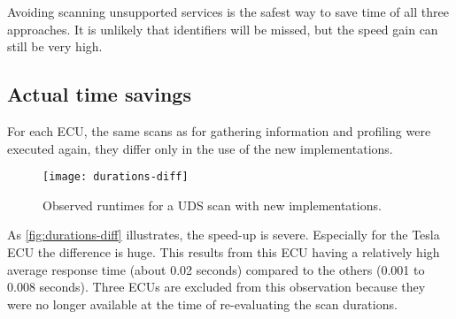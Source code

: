 Avoiding scanning unsupported services is the safest way to save time of all three approaches. It is unlikely that identifiers will be missed, but the speed gain can still be very high.

\subsection{Actual time savings}

For each ECU, the same scans as for gathering information and profiling were executed again, they differ only in the use of the new implementations.

\begin{figure}[h]
    \centering
    \texttt{[image: durations-diff]}
    \caption{Observed runtimes for a UDS scan with new implementations.}
    \label{fig:durations-diff}
\end{figure}

As \autoref{fig:durations-diff} illustrates, the speed-up is severe. Especially for the Tesla ECU the difference is huge.
This results from this ECU having a relatively high average response time (about 0.02 seconds) compared to the others (0.001 to 0.008 seconds).
Three ECUs are excluded from this observation because they were no longer available at the time of re-evaluating the scan durations.
